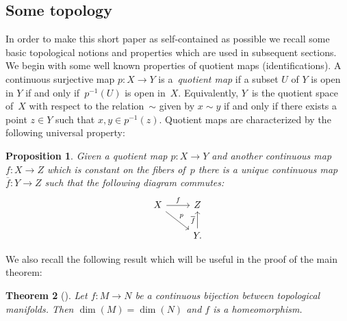 \documentclass[pdftex]{sigma}
\newtheorem{tw}{Theorem}[section]
\newtheorem{prop}[tw]{Proposition}
\begin{document}
\subsection{Some topology}
In order to make this short paper as self-contained as possible we recall some basic topological notions and properties which are used in subsequent sections. We begin with some well known properties of quotient maps (identifications). A continuous surjective map $p\colon X\rightarrow Y$ is a~\emph{quotient map} if a subset $U$ of $Y$ is open in $Y$ if and only if~$p^{-1}(U)$ is open in~$X$. Equivalently, $Y$~is the quotient space of~$X$ with respect to the relation~$\sim$ given by $x\sim y$ if and only if there exists a point $z\in Y$ such that $x,y\in p^{-1}(z)$. Quotient maps are characterized by the following universal property:
\begin{prop}\label{PtQ} Given a quotient map $p\colon X\rightarrow Y$ and another continuous map $f\colon X\rightarrow Z$ which is constant on the fibers of~$p$ there is a unique continuous map $\overline{f}\colon Y\rightarrow Z$ such that the following diagram commutes:
\begin{equation*}
\begin{tikzcd}
X \arrow[rd, "p"] \arrow[r, "f"] & Z \\
& Y.\arrow[u, "\overline{f}"]
\end{tikzcd}
\end{equation*}
\end{prop}
We also recall the following result which will be useful in the proof of the main theorem:
\begin{tw}[{\cite[Corollary~5]{PPS}}]\label{MH} Let $f\colon M\rightarrow N$ be a continuous bijection between topological manifolds. Then $\dim(M)=\dim(N)$ and $f$ is a homeomorphism.
\end{tw}
\end{document}
